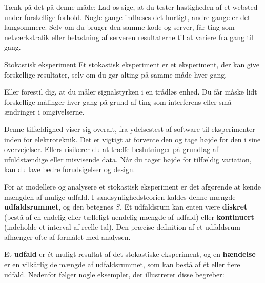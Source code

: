 Tænk på det på denne måde: Lad os sige, at du tester hastigheden af et websted under forskellige forhold. Nogle gange indlæses det hurtigt, andre gange er det langsommere. Selv om du bruger den samme kode og server, får ting som netværkstrafik eller belastning af serveren resultaterne til at variere fra gang til gang. 

\begin{definition}{Stokastisk eksperiment}
    Et stokastisk eksperiment er et eksperiment, der kan give forskellige resultater, selv om du gør alting på samme måde hver gang.
\end{definition}

Eller forestil dig, at du måler signalstyrken i en trådløs enhed. Du får måske lidt forskellige målinger hver gang på grund af ting som interferens eller små ændringer i omgivelserne.

Denne tilfældighed viser sig overalt, fra ydelsestest af software til eksperimenter inden for elektroteknik. Det er vigtigt at forvente den og tage højde for den i sine overvejelser. Ellers risikerer du at træffe beslutninger på grundlag af ufuldstændige eller misvisende data. Når du tager højde for tilfældig variation, kan du lave bedre forudsigelser og design.

For at modellere og analysere et stokastisk eksperiment er det afgørende at kende mængden af mulige udfald. I sandsynlighedsteorien kaldes denne mængde \textbf{udfaldsrummet}, og den betegnes \( S \). Et udfaldsrum kan enten være \textbf{diskret} (bestå af en endelig eller tælleligt uendelig mængde af udfald) eller \textbf{kontinuert} (indeholde et interval af reelle tal). Den præcise definition af et udfaldsrum afhænger ofte af formålet med analysen.

Et \textbf{udfald} er ét muligt resultat af det stokastiske eksperiment, og en \textbf{hændelse} er en vilkårlig delmængde af udfaldsrummet, som kan bestå af ét eller flere udfald. Nedenfor følger nogle eksempler, der illustrerer disse begreber:

